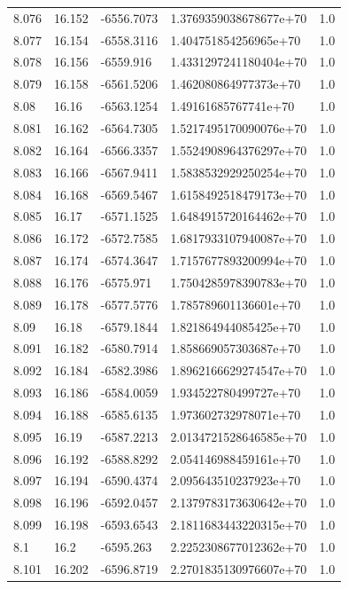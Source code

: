 \begin{tabular}{lllll}
8.076 & 16.152 & -6556.7073 & 1.3769359038678677e+70 & 1.0 \\
8.077 & 16.154 & -6558.3116 & 1.404751854256965e+70 & 1.0 \\
8.078 & 16.156 & -6559.916 & 1.4331297241180404e+70 & 1.0 \\
8.079 & 16.158 & -6561.5206 & 1.462080864977373e+70 & 1.0 \\
8.08 & 16.16 & -6563.1254 & 1.49161685767741e+70 & 1.0 \\
8.081 & 16.162 & -6564.7305 & 1.5217495170090076e+70 & 1.0 \\
8.082 & 16.164 & -6566.3357 & 1.5524908964376297e+70 & 1.0 \\
8.083 & 16.166 & -6567.9411 & 1.5838532929250254e+70 & 1.0 \\
8.084 & 16.168 & -6569.5467 & 1.6158492518479173e+70 & 1.0 \\
8.085 & 16.17 & -6571.1525 & 1.6484915720164462e+70 & 1.0 \\
8.086 & 16.172 & -6572.7585 & 1.6817933107940087e+70 & 1.0 \\
8.087 & 16.174 & -6574.3647 & 1.7157677893200994e+70 & 1.0 \\
8.088 & 16.176 & -6575.971 & 1.7504285978390783e+70 & 1.0 \\
8.089 & 16.178 & -6577.5776 & 1.785789601136601e+70 & 1.0 \\
8.09 & 16.18 & -6579.1844 & 1.821864944085425e+70 & 1.0 \\
8.091 & 16.182 & -6580.7914 & 1.858669057303687e+70 & 1.0 \\
8.092 & 16.184 & -6582.3986 & 1.8962166629274547e+70 & 1.0 \\
8.093 & 16.186 & -6584.0059 & 1.934522780499727e+70 & 1.0 \\
8.094 & 16.188 & -6585.6135 & 1.973602732978071e+70 & 1.0 \\
8.095 & 16.19 & -6587.2213 & 2.0134721528646585e+70 & 1.0 \\
8.096 & 16.192 & -6588.8292 & 2.054146988459161e+70 & 1.0 \\
8.097 & 16.194 & -6590.4374 & 2.095643510237923e+70 & 1.0 \\
8.098 & 16.196 & -6592.0457 & 2.1379783173630642e+70 & 1.0 \\
8.099 & 16.198 & -6593.6543 & 2.1811683443220315e+70 & 1.0 \\
8.1 & 16.2 & -6595.263 & 2.2252308677012362e+70 & 1.0 \\
8.101 & 16.202 & -6596.8719 & 2.2701835130976607e+70 & 1.0 \\

\end{tabular}
